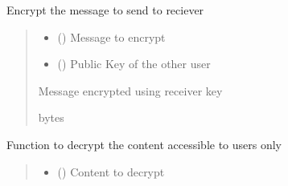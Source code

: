 \documentclass[letterpaper,10pt,english]{sphinxmanual}
\begin{document}
\begin{fulllineitems}
\begin{fulllineitems}
\label{\detokenize{Message:Message.Message._encryptE2E}}
\pysigstartsignatures
{}
\pysigstopsignatures
\sphinxAtStartPar
Encrypt the message to send to reciever
\begin{quote}\begin{description}
\begin{itemize}
\item {} 
\sphinxAtStartPar
{} () \textendash{} Message to encrypt

\item {} 
\sphinxAtStartPar
{} () \textendash{} Public Key of the other user

\end{itemize}

\sphinxAtStartPar
Message encrypted using receiver key

\sphinxAtStartPar
bytes

\end{description}\end{quote}

\end{fulllineitems}


\begin{fulllineitems}
\label{\detokenize{Message:Message.Message._decrypt}}
\pysigstartsignatures
{}
\pysigstopsignatures
\sphinxAtStartPar
Function to decrypt the content accessible to users only
\begin{quote}\begin{description}
\begin{itemize}
\item {} 
\sphinxAtStartPar
{} () \textendash{} Content to decrypt


\end{itemize}
\end{description}
\end{quote}
\end{fulllineitems}
\end{fulllineitems}
\end{document}
